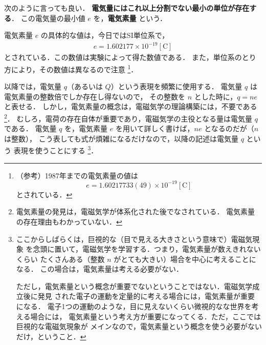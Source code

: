         次のように言っても良い．
        \textbf{電気量にはこれ以上分割でない最小の単位が存在する}．
        この電気量の最小値 $e$ を，\textbf{電気素量} という．

        電気素量 $e$ の具体的な値は，今日ではSI単位系で，
            \begin{align}
                e=1.602177 \times 10^{-19} [\mathrm{C}]
            \end{align}
        とされている．この数値は実験によって得た数値である．
        また，単位系のとり方により，その数値は異なるので注意
            \footnote{
                （参考）1987年までの電気素量の値は
                    \begin{equation*}
                        e=1.60217733(49)\times 10^{-19} [\mathrm{C}]
                    \end{equation*}
                 とされている．
            }．

        以降では，電気量 $q$（あるいは $Q$）という表現を頻繁に使用する．
        電気量 $q$ は電気素量の整数倍でしか存在し得ないので，
        その整数を $n$ とした時に，$q=ne$ と表せる．
        しかし，電気素量の概念は，電磁気学の理論構築には，不要である
            \footnote{
                電気素量の発見は，電磁気学が体系化された後でなされている．
                電気素量の存在理由もわかっていない．
            }．
        むしろ，電荷の存在自体が重要であり，電磁気学の主役となる量は電気量 $q$ である．
        電気量 $q$ を，電気素量 $e$ を用いて詳しく書けば，$ne$ となるのだが（$n$ は整数），
        こう表しても式が煩雑になるだけなので，以降の記述は電気量 $q$ という
        表現を使うことにする
            \footnote{
                ここからしばらくは，巨視的な（目で見える大きさという意味で）電磁気現象
                を念頭に置いて，電磁気学を学習する．つまり，電気素量が数えきれないくらい
                たくさんある（整数 $n$ がとても大きい）場合を中心に考えることになる．
                この場合は，電気素量は考える必要がない．

                ただし，電気素量という概念が重要でないということではない．電磁気学成立後に発見
                された電子の運動を定量的に考える場合には，電気素量が重要になる．
                電子1つの運動のような，目に見えないくらい微視的なな世界を考える場合には，
                電気素量という考え方が重要になってくる．ただ，ここでは巨視的な電磁気現象が
                メインなので，電気素量という概念を使う必要がないだけ，ということ．
            }．

